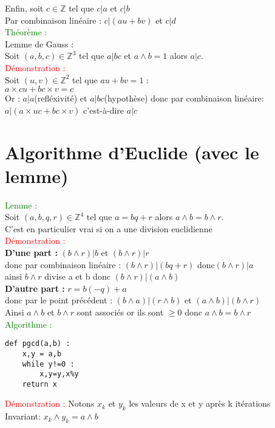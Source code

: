 \documentclass{article}
\begin{document}
Enfin, soit $c \in \mathbb{Z}$ tel que $c|a$ et $c|b$ \\  
Par combinaison linéaire : $c|(au+bv)$ et $c|d$ \\ 
\textcolor{green}{Théorème :} \\ 
Lemme de Gauss : \\ 
Soit $(a,b,c) \in \mathbb{Z}^3$ tel que $a|bc$ et $a \wedge b=1$ alors $a|c$. \\ 
\textcolor{red}{Démonstration :} \\ 
Soit $(u,v) \in \mathbb{Z}^2$ tel que $au+bv=1$ : \\ 
$a\times cu+bc\times v=c$ \\ 
Or : $a|a$(refléxivité) et $a|bc$(hypothèse) donc par combinaison linéaire: \\ 
$a|(a\times uc + bc \times v)$ c'est-à-dire $a|c$
\section{Algorithme d'Euclide (avec le lemme)}
\textcolor{green}{Lemme :} \\
Soit $(a,b,q,r) \in \mathbb{Z}^4$ tel que $a=bq+r$ alors $a \wedge b =b \wedge r$. \\ 
C'est en particulier vrai si on a une division euclidienne \\ 
\textcolor{red}{Démonstration :} \\ 
{\bf D'une part :} $(b\wedge r)|b$ et $(b \wedge r)|r$ \\ 
donc par combinaison linéaire : $(b \wedge r)|(bq+r)$ donc$(b \wedge r)|a$ \\
ainsi $b \wedge r$ divise a et b donc $(b\wedge r )|(a\wedge b)$ \\
{\bf D'autre part :} $r=b(-q)+ a$ \\ 
donc par le point précédent : $(b \wedge a)|(r \wedge b)$ et $(a \wedge b) | (b \wedge r)$ \\ 
Ainsi $a \wedge b$ et $b \wedge r$ sont associés or ils sont $\geq 0$ donc $a \wedge b =b \wedge r$ \\ 
\textcolor{green}{Algorithme :} 
\lstset{language=Python}
\begin{lstlisting}
def pgcd(a,b) :
    x,y = a,b 
    while y!=0 :
        x,y=y,x%y
    return x
\end{lstlisting}
\textcolor{red}{Démonstration :} Notons $x_k$ et $y_k$ les valeurs de x et y après k itérations \\ 
Invariant: \underline{$x_k \wedge y_k=a \wedge b$} \\ 
\end{document}
